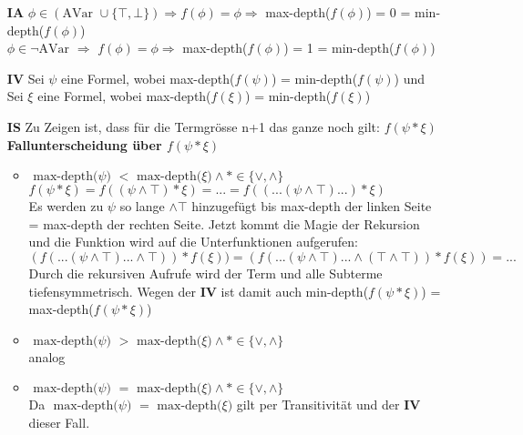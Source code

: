 \documentclass[a4paper,10pt]{scrartcl}
\begin{document}
\begin{itemize}
\item[\textbf{IA}]  $\phi \in (\textrm{AVar }  \cup \{\top, \bot  \}) \Rightarrow f(\phi) = \phi \Rightarrow$ max-depth($f(\phi)$) = 0 = min-depth($f(\phi)$) \\
 $\phi \in \lnot\textrm{AVar } \Rightarrow$ $f(\phi) = \phi \Rightarrow$ max-depth($f(\phi)$) = 1 = min-depth($f(\phi)$) 
\item[\textbf{IV}] Sei $\psi$ eine Formel, wobei max-depth($f(\psi)$) =  min-depth($f(\psi)$) und  \\ Sei $\xi$ eine Formel, wobei max-depth($f(\xi)$) = min-depth($f(\xi)$)
\item[\textbf{IS}] Zu Zeigen ist, dass für die Termgrösse n+1 das ganze noch gilt: $f(\psi  * \xi)$ \\
\textbf{Fallunterscheidung über $f(\psi  * \xi)$}
\begin{itemize}
\item $\textrm{ max-depth($\psi$) $<$ max-depth($\xi$)} \land * \in \{ \lor, \land\}$ \\
$f(\psi  * \xi) = f((\psi \land \top)  * \xi) = ... = f((...(\psi \land \top) ...) * \xi)$ \\
Es werden zu $\psi$ so lange $\land \top$ hinzugefügt bis max-depth der linken Seite = max-depth der rechten Seite. Jetzt kommt die Magie der Rekursion und die Funktion wird auf die Unterfunktionen aufgerufen: \\
$(f(...(\psi \land \top) ... \land \top)) * f(\xi)) = (f(...(\psi \land \top) ... \land (\top \land \top)) * f(\xi)) = ... $ \\
Durch die rekursiven Aufrufe wird der Term und alle Subterme tiefensymmetrisch.
Wegen der \textbf{IV} ist damit auch min-depth($f(\psi * \xi)$) = max-depth($f(\psi * \xi)$)
\item $\textrm{ max-depth($\psi$) $>$ max-depth($\xi$)} \land * \in \{ \lor, \land\}$ \\
analog
\item  $\textrm{ max-depth($\psi$) $=$ max-depth($\xi$)} \land * \in \{ \lor, \land\}$ \\
Da $\textrm{ max-depth($\psi$) $=$ max-depth($\xi$)} $ gilt per Transitivität und der \textbf{IV} dieser Fall.
\end{itemize}


\end{itemize}
\end{document}
